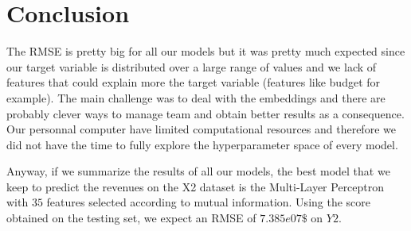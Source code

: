 \section{Conclusion}

The RMSE is pretty big for all our models but it was pretty much expected since our target variable is distributed over a large range of values and we lack of features that could explain more the target variable (features like budget for example).
The main challenge was to deal with the embeddings and there are probably clever ways to manage team and obtain better results as a consequence. Our personnal computer have limited computational resources and therefore we did not have the time to fully explore the hyperparameter space of every model.


Anyway, if we summarize the results of all our models, the best model that we keep to predict the revenues on the X2 dataset is the Multi-Layer Perceptron with $35$ features selected according to mutual information. Using the score obtained on the testing set, we expect an RMSE of $7.385e07 \$$ on $Y2$.
